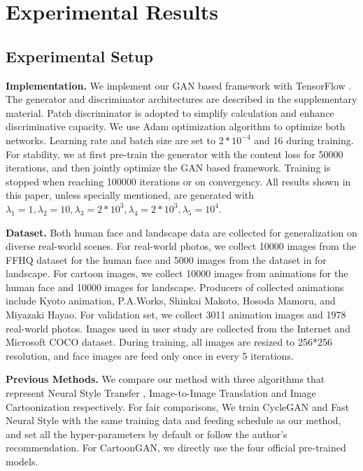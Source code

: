 \documentclass[10pt,twocolumn,letterpaper]{article}
\begin{document}
\section{Experimental Results}
\vspace{-0.3em}
\subsection{Experimental Setup}
\vspace{-0.3em}
\textbf{Implementation.} We implement our GAN based framework with TensorFlow \cite{abadi2016tensorflow}. The generator and discriminator architectures are described in the supplementary material. Patch discriminator \cite{isola2017image} is adopted to simplify calculation and enhance discriminative capacity. We use Adam \cite{kingma2014adam} optimization algorithm to optimize both networks. Learning rate and batch size are set to $2*10^{-4}$ and 16 during training. For stability, we at first pre-train the generator with the content loss for 50000 iterations, and then jointly optimize the GAN based framework. Training is stopped when reaching 100000 iterations or on convergency. All results shown in this paper, unless specially mentioned, are generated with $\lambda_1=1, \lambda_2=10, \lambda_3=2*10^3, \lambda_4=2*10^3, \lambda_5=10^4$. 

\textbf{Dataset.} Both human face and landscape data are collected for generalization on diverse real-world scenes. For real-world photos, we collect 10000 images from the FFHQ dataset \cite{karras2019style} for the human face and 5000 images from the dataset in \cite{CycleGAN2017} for landscape. For cartoon images, we collect 10000 images from animations for the human face and 10000 images for landscape. Producers of collected animations include Kyoto animation, P.A.Works, Shinkai Makoto, Hosoda Mamoru, and Miyazaki Hayao. For validation set, we collect 3011 animation images and 1978 real-world photos. Images used in user study are collected from the Internet and Microsoft COCO \cite{lin2014microsoft} dataset. During training, all images are resized to 256*256 resolution, and face images are feed only once in every 5 iterations.

\textbf{Previous Methods.} We compare our method with three algorithms that represent Neural Style Transfer \cite{johnson2016perceptual}, Image-to-Image Translation \cite{CycleGAN2017} and Image Cartoonization \cite{chen2018cartoongan} respectively. For fair comparisons, We train CycleGAN and Fast Neural Style with the same training data and feeding schedule as our method, and set all the hyper-parameters by default or follow the author's recommendation. For CartoonGAN, we directly use the four official pre-trained models. 
\end{document}
